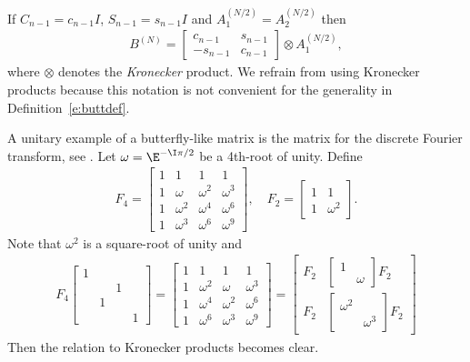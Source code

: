 \begin{example}
  If $C_{n-1}= c_{n-1}I$, $S_{n-1} = s_{n-1}I$ and $A_1^{(N/2)} = A_2^{(N/2)}$ then
  \begin{align}
    B^{(N)} = \begin{bmatrix} c_{n-1} & s_{n-1} \\ - s_{n-1} & c_{n-1} \end{bmatrix} \otimes A_1 ^{(N/2)},
  \end{align}
  where $\otimes$ denotes the \emph{Kronecker} product.  We refrain from using Kronecker products because this notation is not convenient for the generality in Definition~\ref{e:buttdef}.
\end{example}

\begin{example}
  A unitary example of a butterfly-like matrix is the matrix for the discrete Fourier transform, see \cite[Section 1.4]{VanLoan1992}.  Let $\omega = \E^{- \I \pi/2}$ be a 4th-root of unity.  Define
  \begin{align}
    F_4 = \begin{bmatrix} 1 & 1 & 1 & 1\\ 1 & \omega & \omega^2 & \omega^3\\
      1 & \omega^2 & \omega^4 & \omega^6\\
      1 & \omega^3 & \omega^6 & \omega^9 \end{bmatrix}, \quad F_2 = \begin{bmatrix} 1 & 1 \\  1 & \omega^2 \end{bmatrix}.
  \end{align}
  Note that $\omega^2$ is a square-root of unity and
  \begin{align}
    F_4 \begin{bmatrix} 1 & \\ && 1 \\ &1 \\ &&& 1 \end{bmatrix} = \begin{bmatrix} 1 & 1 & 1 & 1\\ 1 & \omega^2 & \omega & \omega^3\\
      1 & \omega^4 & \omega^2 & \omega^6\\
      1 & \omega^6 & \omega^3 & \omega^9 \end{bmatrix} = \begin{bmatrix} F_2 & \begin{bmatrix} 1 \\ & \omega \end{bmatrix} F_2  \\
    F_2  &  \begin{bmatrix} \omega^2 &\\ & \omega^3 \end{bmatrix} F_2\end{bmatrix}
  \end{align}
  Then the relation to Kronecker products becomes clear.
\end{example}

